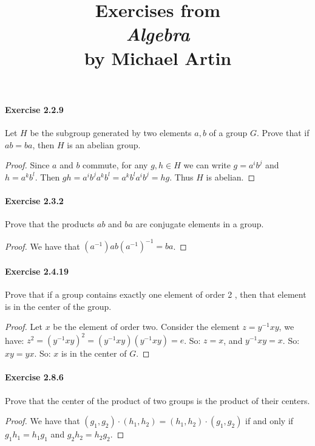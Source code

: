 \documentclass{article}
\title{\textbf{
Exercises from \\
\textit{Algebra} \\
by Michael Artin
}}
\date{}
\begin{document}
\maketitle


\paragraph{Exercise 2.2.9} Let $H$ be the subgroup generated by two elements $a, b$ of a group $G$. Prove that if $a b=b a$, then $H$ is an abelian group.
\begin{proof}
    Since $a$ and $b$ commute, for any $g, h\in H$ we can write $g=a^ib^j$ and $h = a^kb^l$. Then $gh = a^ib^ja^kb^l = a^kb^la^ib^j = hg$. Thus $H$ is abelian. 
\end{proof}



\paragraph{Exercise 2.3.2} Prove that the products $a b$ and $b a$ are conjugate elements in a group.
\begin{proof}
    We have that $(a^{-1})ab(a^{-1})^{-1} = ba$. 
\end{proof}



\paragraph{Exercise 2.4.19} Prove that if a group contains exactly one element of order 2 , then that element is in the center of the group.
\begin{proof}
   Let $x$ be the element of order two. Consider the element $z=y^{-1} x y$, we have: $z^2=\left(y^{-1} x y\right)^2=\left(y^{-1} x y\right)\left(y^{-1} x y\right)=e$. So: $z=x$, and $y^{-1} x y=x$. So: $x y=y x$. So: $x$ is in the center of $G$. 
\end{proof}



\paragraph{Exercise 2.8.6} Prove that the center of the product of two groups is the product of their centers.
\begin{proof}
    We have that $(g_1, g_2)\cdot (h_1, h_2) = (h_1, h_2)\cdot (g_1, g_2)$ if and only if $g_1h_1 = h_1g_1$ and $g_2h_2 = h_2g_2$. 
\end{proof}
\end{document}
